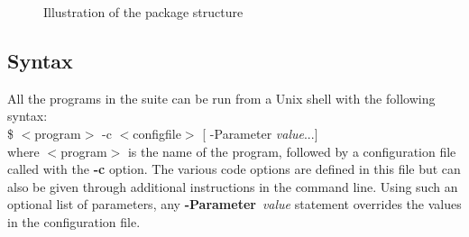 \documentclass[12pt]{article}
\begin{document}
\begin{figure} 
\caption{Illustration of the package structure } 
\label{fig:skim}
\end{figure} 

%
\subsection{Syntax}

 All the programs in the suite can be run from a Unix shell with the following
 syntax: \\
%
\$  $<$program$>$ -c  $<$configfile$>$ [ -Parameter {\it value}...] \\
%
 where $<$program$>$ is the name of the program, followed by a
 configuration file called with the  {\bf -c } option. The various code options are defined in this file but can also be given through additional instructions in the command line. Using such an optional list of parameters, any {\bf -Parameter}~{\it value} statement overrides the values in the configuration file.  
\end{document}
